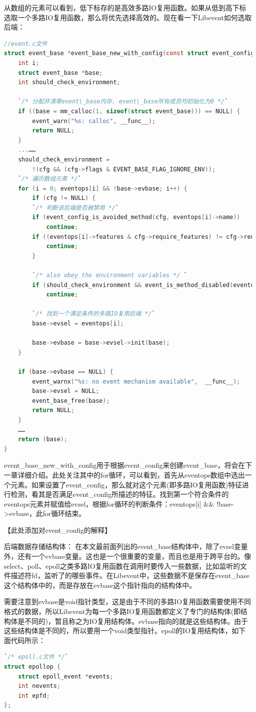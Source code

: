 \documentclass[11pt,a4paper]{article}
\begin{document}
从数组的元素可以看到，低下标存的是高效多路IO复用函数。如果从低到高下标选取一个多路IO复用函数，那么将优先选择高效的。现在看一下Libevent如何选取后端：
\begin{lstlisting}[language=C]
//event.c文件
struct event_base *event_base_new_with_config(const struct event_config *cfg) {  
	int i;
	struct event_base *base;
	int should_check_environment;

	`/* 分配并清零event\_base内存. event\_base所有成员均初始化为0 */`
	if ((base = mm_calloc(1, sizeof(struct event_base))) == NULL) {
		event_warn("%s: calloc", __func__);
		return NULL;
	}
	...……
	should_check_environment =
		!(cfg && (cfg->flags & EVENT_BASE_FLAG_IGNORE_ENV));
	`/* 遍历数组元素 */`
	for (i = 0; eventops[i] && !base->evbase; i++) {
		if (cfg != NULL) {
		`/* 判断该后端是否被禁用 */`
		if (event_config_is_avoided_method(cfg, eventops[i]->name))
			continue;
		if ((eventops[i]->features & cfg->require_features) != cfg->require_features)
			continue;
		}

		`/* also obey the environment variables */ `
		if (should_check_environment && event_is_method_disabled(eventops[i]->name))
			continue;
  
		`/* 找到一个满足条件的多路IO复用后端 */`
		base->evsel = eventops[i];

		base->evbase = base->evsel->init(base);
	}

	if (base->evbase == NULL) {
		event_warnx("%s: no event mechanism available",  __func__);
		base->evsel = NULL;
		event_base_free(base);
		return NULL;
	}
	……
	return (base);
} 
\end{lstlisting}
event\_base\_new\_with\_config用于根据event\_config来创建event\_base，将会在下一章详细介绍。此处关注其中的for循环，可以看到，首先从eventops数组中选出一个元素。如果设置了event\_config，那么就对这个元素(即多路IO复用函数)特征进行检测，看其是否满足event\_config所描述的特征。找到第一个符合条件的eventops元素并赋值给evsel，根据for循环的判断条件：eventops[i] \&\& !base->evbase，此for循环结束。

【此处添加对event\_config的解释】

后端数据存储结构体：
在本文最前面列出的event\_base结构体中，除了evsel变量外，还有一个evbase变量。这也是一个很重要的变量，而且也是用于跨平台的。像select、poll、epoll之类多路IO复用函数在调用时要传入一些数据，比如监听的文件描述符fd，监听了的哪些事件。在Libevent中，这些数据不是保存在event\_base这个结构体中的，而是存放在evbase这个指针指向的结构体中。

需要注意到evbase是void指针类型，这是由于不同的多路IO复用函数需要使用不同格式的数据，所以Libevent为每一个多路IO复用函数都定义了专门的结构体(即结构体是不同的)，暂且称之为IO复用结构体。evbase指向的就是这些结构体。由于这些结构体是不同的，所以要用一个void类型指针。epoll的IO复用结构体，如下面代码所示：
\begin{lstlisting}[language=C]
`/* epoll.c文件 */`
struct epollop {
	struct epoll_event *events;
	int nevents;
	int epfd;
};
\end{lstlisting}
\end{document}
